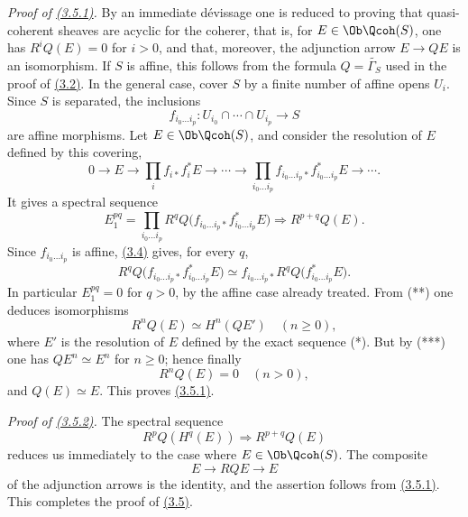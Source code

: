 \emph{Proof of \hyperlink{sga6.e02.prop.3-5}{(3.5.1)}.} By an immediate dévissage one is reduced to proving that quasi-coherent sheaves are acyclic for the coherer, that is, for $E\in\Ob\Qcoh(S)$, one has $R^iQ(E)=0$ for $i>0$, and that, moreover, the adjunction arrow $E\to QE$ is an isomorphism. If $S$ is affine, this follows from the formula $Q=\widetilde{\Gamma_S}$ used in the proof of \hyperlink{sga6.e02.lem.3-2}{(3.2)}. In the general case, cover $S$ by a finite number of affine opens $U_i$. Since $S$ is separated, the inclusions
\[
 f_{i_0\ldots i_p}:U_{i_0}\cap\cdots\cap U_{i_p}\longrightarrow S
\]
are affine morphisms. Let $E\in\Ob\Qcoh(S)$, and consider the resolution of $E$ defined by this covering,
\begin{equation}\tag{*}
 0\longrightarrow E\longrightarrow \prod_i f_{i*}f_i^*E\longrightarrow\cdots\longrightarrow
 \prod_{i_0\ldots i_p}f_{i_0\ldots i_p*}f_{i_0\ldots i_p}^*E\longrightarrow\cdots .
\end{equation}
It gives a spectral sequence
\begin{equation}\tag{**}
 E_1^{pq}=\prod_{i_0\ldots i_p}R^qQ\bigl(f_{i_0\ldots i_p*}f_{i_0\ldots i_p}^*E\bigr)
 \Longrightarrow R^{p+q}Q(E).
\end{equation}
Since $f_{i_0\ldots i_p}$ is affine, \hyperlink{sga6.e02.lem.3-4}{(3.4)} gives, for every $q$,
\begin{equation}\tag{***}
 R^qQ\bigl(f_{i_0\ldots i_p*}f_{i_0\ldots i_p}^*E\bigr)
 \simeq f_{i_0\ldots i_p*}R^qQ\bigl(f_{i_0\ldots i_p}^*E\bigr).
\end{equation}
In particular $E_1^{pq}=0$ for $q>0$, by the affine case already treated. From (**) one deduces isomorphisms
\[
 R^nQ(E)\simeq H^n(QE')\quad(n\geq0),
\]
where $E'$ is the resolution of $E$ defined by the exact sequence (*). But by (***) one has $QE^n\simeq E^n$ for $n\geq0$; hence finally
\[
 R^nQ(E)=0\quad(n>0),
\]
and $Q(E)\simeq E$. This proves \hyperlink{sga6.e02.prop.3-5}{(3.5.1)}.

\emph{Proof of \hyperlink{sga6.e02.prop.3-5}{(3.5.2)}.} The spectral sequence
\[
 R^pQ(H^q(E))\Longrightarrow R^{p+q}Q(E)
\]
reduces us immediately to the case where $E\in\Ob\Qcoh(S)$. The composite
\[
 E\longrightarrow RQE\longrightarrow E
\]
of the adjunction arrows is the identity, and the assertion follows from \hyperlink{sga6.e02.prop.3-5}{(3.5.1)}. This completes the proof of \hyperlink{sga6.e02.prop.3-5}{(3.5)}.

